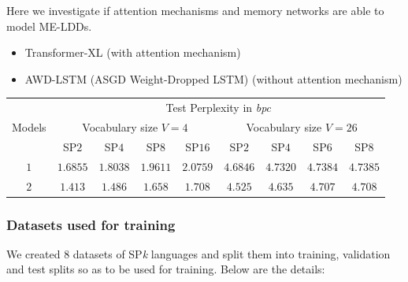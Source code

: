 \documentclass[a0,portrait]{a0poster}
\begin{document}
\begin{multicols}{2}
\color{black}

Here we investigate if attention mechanisms and memory networks are able to model ME-LDDs.

\begin{itemize}
    \item Transformer-XL (with attention mechanism)
    \item AWD-LSTM (ASGD Weight-Dropped LSTM) (without attention mechanism)
\end{itemize}

\begin{center}\vspace{0.5em}
\begin{tabular}{c c c c c | c c c c}
\toprule
\multirow{3}{*}{Models} & \multicolumn{8}{c}{Test Perplexity in \emph{bpc}} \\ \cline{2-9}
	& \multicolumn{4}{c|}{Vocabulary size $V{=}4$} & \multicolumn{4}{c}{Vocabulary size $V{=}26$} \\ \cline{2-9}
    & SP$2$ & SP$4$ & SP$8$ & SP$16$ & SP$2$ & SP$4$ & SP$6$ & SP$8$ \\
\midrule
$1$   & $1.6855$ & $1.8038$ & $1.9611$ & $2.0759$ & $4.6846$ & $4.7320$ & $4.7384$ & $4.7385$ \\
$2$   & $1.413$ & $1.486$ & $1.658$ & $1.708$ & $4.525$ & $4.635$ & $4.707$ & $4.708$ \\
\bottomrule
\end{tabular}
\label{tab:perplexity_score}
\end{center}

\color{tudLogoColor}

\subsubsection*{Datasets used for training}

\color{black}

We created 8 datasets of SP\emph{k} languages and split them into training, validation and test splits so as to be used for training. Below are the details:


\end{multicols}
\end{document}
